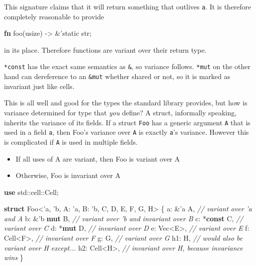 \documentclass[a4paper,]{book}
\newenvironment{Shaded}{\begin{snugshade}}{\end{snugshade}}
\newcommand{\KeywordTok}[1]{\textcolor[rgb]{0.13,0.29,0.53}{\textbf{{#1}}}}
\newcommand{\DataTypeTok}[1]{\textcolor[rgb]{0.13,0.29,0.53}{{#1}}}
\newcommand{\CommentTok}[1]{\textcolor[rgb]{0.56,0.35,0.01}{\textit{{#1}}}}
\newcommand{\OtherTok}[1]{\textcolor[rgb]{0.56,0.35,0.01}{{#1}}}
\newcommand{\NormalTok}[1]{{#1}}
\providecommand{\tightlist}{%
  \setlength{\itemsep}{0pt}\setlength{\parskip}{0pt}}
\begin{document}
This signature claims that it will return something that outlives
\texttt{\textquotesingle{}a}. It is therefore completely reasonable to
provide

\begin{Shaded}
\begin{Highlighting}[]
\KeywordTok{fn} \NormalTok{foo(}\DataTypeTok{usize}\NormalTok{) -> &}\OtherTok{'static} \DataTypeTok{str}\NormalTok{;}
\end{Highlighting}
\end{Shaded}

in its place. Therefore functions are variant over their return type.

\texttt{*const} has the exact same semantics as \texttt{\&}, so variance
follows. \texttt{*mut} on the other hand can dereference to an
\texttt{\&mut} whether shared or not, so it is marked as invariant just
like cells.

This is all well and good for the types the standard library provides,
but how is variance determined for type that \emph{you} define? A
struct, informally speaking, inherits the variance of its fields. If a
struct \texttt{Foo} has a generic argument \texttt{A} that is used in a
field \texttt{a}, then Foo's variance over \texttt{A} is exactly
\texttt{a}'s variance. However this is complicated if \texttt{A} is used
in multiple fields.

\begin{itemize}
\tightlist
\item
  If all uses of A are variant, then Foo is variant over A
\item
  Otherwise, Foo is invariant over A
\end{itemize}

\begin{Shaded}
\begin{Highlighting}[]
\KeywordTok{use} \NormalTok{std::cell::Cell;}

\KeywordTok{struct} \NormalTok{Foo<}\OtherTok{'a}\NormalTok{, }\OtherTok{'b}\NormalTok{, A: }\OtherTok{'a}\NormalTok{, B: }\OtherTok{'b}\NormalTok{, C, D, E, F, G, H> \{}
    \NormalTok{a: &}\OtherTok{'a} \NormalTok{A,     }\CommentTok{// variant over 'a and A}
    \NormalTok{b: &}\OtherTok{'b} \KeywordTok{mut} \NormalTok{B, }\CommentTok{// variant over 'b and invariant over B}
    \NormalTok{c: *}\KeywordTok{const} \NormalTok{C,  }\CommentTok{// variant over C}
    \NormalTok{d: *}\KeywordTok{mut} \NormalTok{D,    }\CommentTok{// invariant over D}
    \NormalTok{e: }\DataTypeTok{Vec}\NormalTok{<E>,    }\CommentTok{// variant over E}
    \NormalTok{f: Cell<F>,   }\CommentTok{// invariant over F}
    \NormalTok{g: G,         }\CommentTok{// variant over G}
    \NormalTok{h1: H,        }\CommentTok{// would also be variant over H except...}
    \NormalTok{h2: Cell<H>,  }\CommentTok{// invariant over H, because invariance wins}
\NormalTok{\}}
\end{Highlighting}
\end{Shaded}
\end{document}
